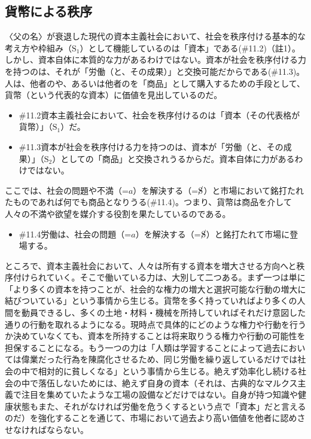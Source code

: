 \subsection{貨幣による秩序}\label{ux8ca8ux5e63ux306bux3088ux308bux79e9ux5e8f}

〈父の名〉が衰退した現代の資本主義社会において、社会を秩序付ける基本的な考え方や枠組み（\(\textrm{S}_1\)）として機能しているのは「資本」である(\#11.2)（註1）。しかし、資本自体に本質的な力があるわけではない。資本が社会を秩序付ける力を持つのは、それが「労働（と、その成果）」と交換可能だからである(\#11.3)。人は、他者のや、あるいは他者のを「商品」として購入するための手段として、貨幣（という代表的な資本）に価値を見出しているのだ。

\begin{note}{}
  \begin{itemize}
    \tightlist
    \item{\#11.2}資本主義社会において、社会を秩序付けるのは「資本（その代表格が貨幣）」（$\textrm{S}_1$）だ。
    \item{\#11.3}資本が社会を秩序付ける力を持つのは、資本が「労働（と、その成果）」（$\textrm{S}_2$）としての「商品」と交換されうるからだ。資本自体に力があるわけではない。
  \end{itemize}
\end{note}

ここでは、社会の問題や不満（=\(a\)）を解決する（=\(\cancel{\textrm{S}}\)）と市場において銘打たれたものであれば何でも商品となりうる(\#11.4)。つまり、貨幣は商品を介して人々の不満や欲望を媒介する役割を果たしているのである。

\begin{note}{}
  \begin{itemize}
    \tightlist
    \item{\#11.4}労働は、社会の問題（=$a$）を解決する（=$\cancel{\textrm{S}}$）と銘打たれて市場に登場する。
  \end{itemize}
\end{note}

ところで、資本主義社会において、人々は所有する資本を増大させる方向へと秩序付けられていく。そこで働いている力は、大別して二つある。まず一つは単に「より多くの資本を持つことが、社会的な権力の増大と選択可能な行動の増大に結びついている」という事情から生じる。貨幣を多く持っていればより多くの人間を動員できるし、多くの土地・材料・機械を所持していればそれだけ意図した通りの行動を取れるようになる。現時点で具体的にどのような権力や行動を行うか決めていなくても、資本を所持することは将来取りうる権力や行動の可能性を担保することになる。もう一つの力は「人類は学習することによって過去においては偉業だった行為を陳腐化させるため、同じ労働を繰り返しているだけでは社会の中で相対的に貧しくなる」という事情から生じる。絶えず効率化し続ける社会の中で落伍しないためには、絶えず自身の資本（それは、古典的なマルクス主義で注目を集めていたような工場の設備などだけではない。自身が持つ知識や健康状態もまた、それがなければ労働を危うくするという点で「資本」だと言えるのだ）を強化することを通じて、市場において過去より高い価値を他者に認めさせなければならない。

